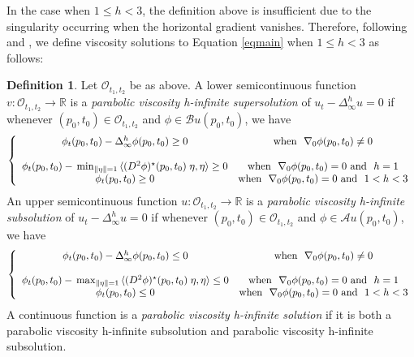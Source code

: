 \documentclass[12pt]{amsart}
\theoremstyle{definition}
\newtheorem{definition}{Definition}
\theoremstyle{remark}
\numberwithin{equation}{section}
\begin{document}
In the case when $1\leq h<3$, the definition above is insufficient due to the singularity occurring when the horizontal gradient vanishes.  Therefore, following \cite{JK:JK} and \cite{PV}, we define viscosity solutions to
Equation \eqref{eqmain} when $1\leq h<3$ as follows: 
\begin{definition}\label{2}
Let $\mathcal{O}_{t_1,t_2}$ be as above. A lower semicontinuous function 
$v:\mathcal{O}_{t_1,t_2}\to\mathbb{R}$ is a \emph{parabolic viscosity h-infinite supersolution} of $u_t-\Delta^h_\infty u=0$ if whenever $(p_0,t_0)\in \mathcal{O}_{t_1,t_2}$ and $\phi\in \mathcal{B}u(p_0,t_0)$, we have 
\begin{eqnarray*}\left\{\begin{array}{cc}
\phi_t(p_0,t_0)-\Delta^h_\infty \phi(p_0,t_0) \geq 0 & \textmd{when}\ \ \nabla_0 \phi(p_0,t_0) \neq 0 \\ \mbox{} & \mbox{} \\
\phi_t(p_0,t_0)-{\displaystyle} \min_{\|\eta\|=1}{\ensuremath{\langle {(D^2\phi)^\star(p_0,t_0)\;\eta} , {\eta} \rangle}} \geq 0 & \textmd{when}\ \ \nabla_0 \phi(p_0,t_0) = 0 \ \textmd{and\ \ } h=1 \\
\phi_t(p_0,t_0) \geq 0 & \textmd{when}\ \ \nabla_0 \phi(p_0,t_0) = 0 \ \textmd{and\ \ } 1<h<3 
\end{array}\right.
\end{eqnarray*}
An upper semicontinuous function 
$u:\mathcal{O}_{t_1,t_2}\to\mathbb{R}$ is a \emph{parabolic viscosity h-infinite subsolution} of $u_t-\Delta^h_\infty u=0$ if whenever $(p_0,t_0)\in \mathcal{O}_{t_1,t_2}$ and $\phi\in \mathcal{A}u(p_0,t_0)$, we have 
\begin{eqnarray*}\left\{\begin{array}{cc}
\phi_t(p_0,t_0)-\Delta^h_\infty \phi(p_0,t_0) \leq 0 & \textmd{when}\ \ \nabla_0 \phi(p_0,t_0) \neq 0 \\  \mbox{} & \mbox{} \\
\phi_t(p_0,t_0)-{\displaystyle} \max_{\|\eta\|=1}{\ensuremath{\langle {(D^2\phi)^\star(p_0,t_0)\;\eta} , {\eta} \rangle}} \leq 0 & \textmd{when}\ \ \nabla_0 \phi(p_0,t_0) = 0 \ \textmd{and\ \ } h=1 \\
\phi_t(p_0,t_0) \leq 0 & \textmd{when}\ \ \nabla_0 \phi(p_0,t_0) = 0 \ \textmd{and\ \ } 1<h<3 
\end{array}\right.
\end{eqnarray*}
A continuous function is a \emph{parabolic viscosity h-infinite solution} if it is both a parabolic viscosity h-infinite subsolution and parabolic viscosity h-infinite subsolution. 
\end{definition}
\end{document}
